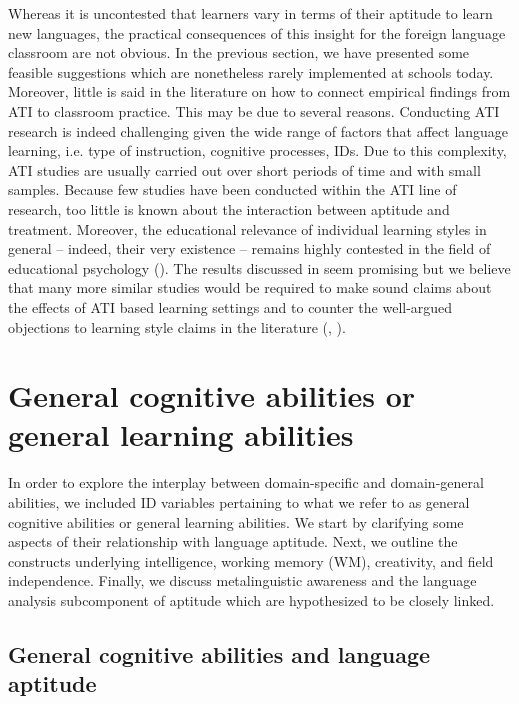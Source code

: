 \documentclass[output=paper]{langscibook}
\begin{document}
Whereas it is uncontested that learners vary in terms of their aptitude to learn new languages, the practical consequences of this insight for the foreign language classroom are not obvious. In the previous section, we have presented some feasible suggestions which are nonetheless rarely implemented at schools today. Moreover, little is said in the literature on how to connect empirical findings from ATI to classroom practice. This may be due to several reasons. Conducting ATI research is indeed challenging given the wide range of factors that affect language learning, i.e. type of instruction, cognitive processes, IDs. Due to this complexity, ATI studies are usually carried out over short periods of time and with small samples. Because few studies have been conducted within the ATI line of research, too little is known about the interaction between aptitude and treatment. Moreover, the educational relevance of individual learning styles in general – indeed, their very existence – remains highly contested in the field of educational psychology (\citealt{RienerWillingham2010}). The results discussed in  seem promising but we believe that many more similar studies would be required to make sound claims about the effects of ATI based learning settings and to counter the well-argued objections to learning style claims in the literature (\citealt{PashlerEtAl2008}, \citealt{RienerWillingham2010}). 

\section{General cognitive abilities or general learning abilities}\label{sec:01:3}

In order to explore the interplay between domain-specific and domain-general abilities, we included ID variables pertaining to what we refer to as general cognitive abilities or general learning abilities. We start by clarifying some aspects of their relationship with language aptitude. Next, we outline the constructs underlying intelligence, working memory (WM), creativity, and field independence. Finally, we discuss metalinguistic awareness and the language analysis subcomponent of aptitude which are hypothesized to be closely linked.

\subsection{General cognitive abilities and language aptitude} %
\end{document}
